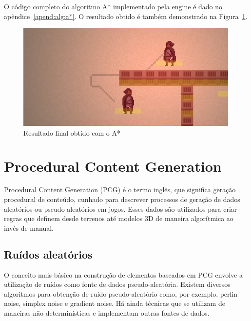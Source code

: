 \documentclass[12pt, 
openright, 
oneside, 
a4paper,    
brazil]{facom-ufu-abntex2}
\begin{document}
O código completo do algoritmo A* implementado pela engine é dado no apêndice~\ref{apend:alg:a*}. O resultado obtido é também demonstrado na Figura~\ref{fig:pathPlanning}.

\begin{figure}[H]
	\centering
	\includegraphics[width=30em]{imagens/pathPlanning.png}
	\caption{Resultado final obtido com o A* }
	\label{fig:pathPlanning}
\end{figure}

\chapter{Procedural Content Generation}
\label{cap:pcg}
Procedural Content Generation (PCG) é o termo inglês, que significa geração procedural de conteúdo, cunhado para descrever processos de geração de dados aleatórios ou pseudo-aleatórios em jogos. Esses dados são utilizados para criar regras que definem desde terrenos até modelos 3D de maneira algorítmica ao invés de manual.

\section{Ruídos aleatórios}
O conceito mais básico na construção de elementos baseados em PCG envolve a utilização de ruídos como fonte de dados pseudo-aleatória. Existem diversos algoritmos para obtenção de ruído pseudo-aleatório como, por exemplo, perlin noise, simplex noise e gradient noise. Há ainda técnicas que se utilizam de maneiras não determinísticas e implementam outras fontes de dados.
\end{document}
